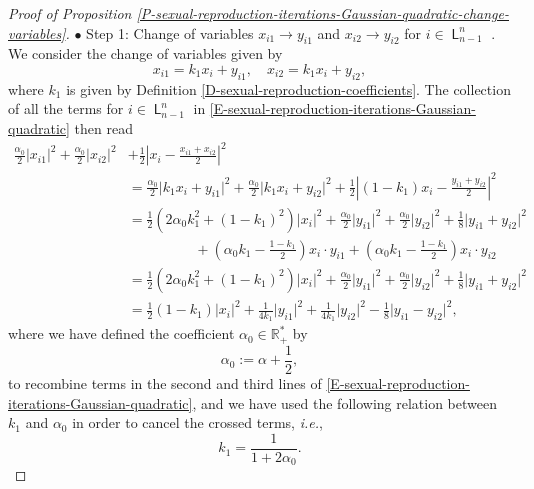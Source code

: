 \documentclass[reqno]{amsart}
\DeclareMathOperator{\Level}{\mathsf{L}}
\numberwithin{equation}{section}
\begin{document}
{\begin{proof}[Proof of Proposition \ref{P-sexual-reproduction-iterations-Gaussian-quadratic-change-variables}]
$\bullet$ {\sc Step 1}: Change of variables $x_{i1}\rightarrow y_{i1}$ and $x_{i2}\rightarrow y_{i2}$ for $i\in \Level_{n-1}^n$ .\\
We consider the change of variables given by
$$
x_{i1}=k_1x_i+y_{i1},\quad x_{i2}=k_1x_i+y_{i2},
$$
where $k_1$ is given by Definition \ref{D-sexual-reproduction-coefficients}. The collection of all the terms for $i\in \Level_{n-1}^n$ in \eqref{E-sexual-reproduction-iterations-Gaussian-quadratic} then read
\begin{align*}
\frac{\alpha_0}{2}\vert x_{i1}\vert^2+\frac{\alpha_0}{2}\vert x_{i2}\vert^2&+\frac{1}{2}\left\vert x_i-\frac{x_{i1}+x_{i2}}{2}\right\vert^2\\
&=\frac{\alpha_0}{2}\vert k_1x_i+y_{i1}\vert^2+\frac{\alpha_0}{2}\vert k_1 x_i+y_{i2}\vert^2+\frac{1}{2}\left\vert (1-k_1)x_i-\frac{y_{i1}+y_{i2}}{2}\right\vert^2\\
&=\frac{1}{2}\left(2\alpha_0 k_1^2+(1-k_1)^2\right)\vert x_i\vert^2+\frac{\alpha_0}{2}\vert y_{i1}\vert^2+\frac{\alpha_0}{2}\vert y_{i2}\vert^2+\frac{1}{8}\vert y_{i1}+y_{i2}\vert^2\\
&\hspace{2cm} +\left(\alpha_0 k_1-\frac{1-k_1}{2}\right)x_i\cdot y_{i1}+\left(\alpha_0 k_1-\frac{1-k_1}{2}\right)x_i\cdot y_{i2}\\
&=\frac{1}{2}\left(2\alpha_0 k_1^2+(1-k_1)^2\right)\vert x_i\vert^2+\frac{\alpha_0}{2}\vert y_{i1}\vert^2+\frac{\alpha_0}{2}\vert y_{i2}\vert^2+\frac{1}{8}\vert y_{i1}+y_{i2}\vert^2\\
&=\frac{1}{2}(1-k_1)\vert x_i\vert^2+\frac{1}{4 k_1}\vert y_{i1}\vert^2+\frac{1}{4 k_1}\vert y_{i2}\vert^2-\frac{1}{8}\vert y_{i1}-y_{i2}\vert^2,
\end{align*}
where we have defined the coefficient $\alpha_0\in \mathbb{R}_+^*$ by
$$\alpha_0:=\alpha+\frac{1}{2},$$
to recombine terms in the second and third lines of \eqref{E-sexual-reproduction-iterations-Gaussian-quadratic}, and we have used the following relation between $k_1$ and $\alpha_0$ in order to cancel the crossed terms, {\em i.e.},
$$k_1=\frac{1}{1+2\alpha_0}.$$

\medskip


\end{proof}}
\end{document}
